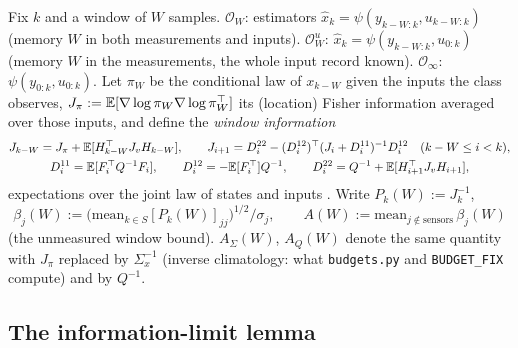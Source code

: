 \begin{definition}\label{def:li-class}
Fix $k$ and a window of $W$ samples. $\mathcal O_W$: estimators $\hat x_k=\psi(y_{k-W:k},u_{k-W:k})$ (memory $W$ in
both measurements and inputs). $\mathcal O^u_W$: $\hat x_k=\psi(y_{k-W:k},u_{0:k})$ (memory $W$ in the
measurements, the whole input record known). $\mathcal O_\infty$: $\psi(y_{0:k},u_{0:k})$. Let $\pi_W$ be the
conditional law of $x_{k-W}$ given the inputs the class observes, $J_\pi:=\mathbb E[\nabla\log\pi_W\nabla\log\pi_W^\top]$ its
(location) Fisher information averaged over those inputs, and define the \emph{window information}
\begin{gather*}
J_{k-W}=J_\pi+\mathbb E[H_{k-W}^\top J_vH_{k-W}],\qquad J_{i+1}=D^{22}_i-(D^{12}_i)^\top(J_i+D^{11}_i)^{-1}D^{12}_i\quad(k-W\le i<k),\\
D^{11}_i=\mathbb E[F_i^\top Q^{-1}F_i],\qquad D^{12}_i=-\mathbb E[F_i^\top]Q^{-1},\qquad D^{22}_i=Q^{-1}+\mathbb E[H_{i+1}^\top J_vH_{i+1}],
\end{gather*}
expectations over the joint law of states and inputs \citep{tichavsky1998posterior}. Write $P_k(W):=J_k^{-1}$,
\[
\beta_j(W):=\big(\mathrm{mean}_{k\in S}[P_k(W)]_{jj}\big)^{1/2}/\sigma_j,\qquad A(W):=\mathrm{mean}_{j\notin\text{sensors}}\,\beta_j(W)
\]
(the unmeasured window bound). $A_\Sigma(W)$, $A_Q(W)$ denote the same quantity with $J_\pi$ replaced by
$\Sigma_x^{-1}$ (inverse climatology: what \texttt{budgets.py} and \texttt{BUDGET\_FIX} compute) and by $Q^{-1}$.
\end{definition}

\subsection{The information-limit lemma}


